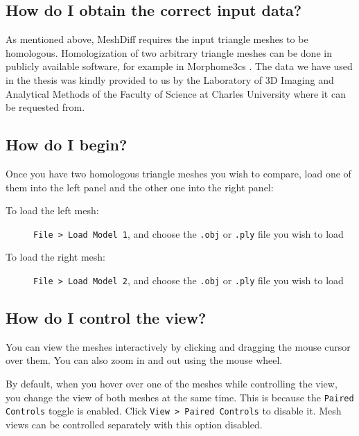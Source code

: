 
\subsection{How do I obtain the correct input data?}
\label{attch:user_doc-input_data}

As mentioned above, MeshDiff requires the input triangle meshes to be homologous. Homologization of two arbitrary triangle meshes can be done in publicly available software, for example in Morphome3cs \citep{Morpho}. The data we have used in the thesis was kindly provided to us by the Laboratory of 3D Imaging and Analytical Methods of the Faculty of Science at Charles University where it can be requested from.

\subsection{How do I begin?}
\label{attch:user_doc-begin}

Once you have two homologous triangle meshes you wish to compare, load one of them into the left panel and the other one into the right panel:

\begin{description}
\item [To load the left mesh:] \verb+File > Load Model 1+, and choose the \verb+.obj+ or \verb+.ply+ file you wish to load
\item [To load the right mesh:] \verb+File > Load Model 2+, and choose the \verb+.obj+ or \verb+.ply+ file you wish to load
\end{description}

\subsection{How do I control the view?}
\label{attch:user_doc-view_control}

You can view the meshes interactively by clicking and dragging the mouse cursor over them. You can also zoom in and out using the mouse wheel.

By default, when you hover over one of the meshes while controlling the view, you change the view of both meshes at the same time. This is because the \verb+Paired Controls+ toggle is enabled. Click \verb+View > Paired Controls+ to disable it. Mesh views can be controlled separately with this option disabled.

